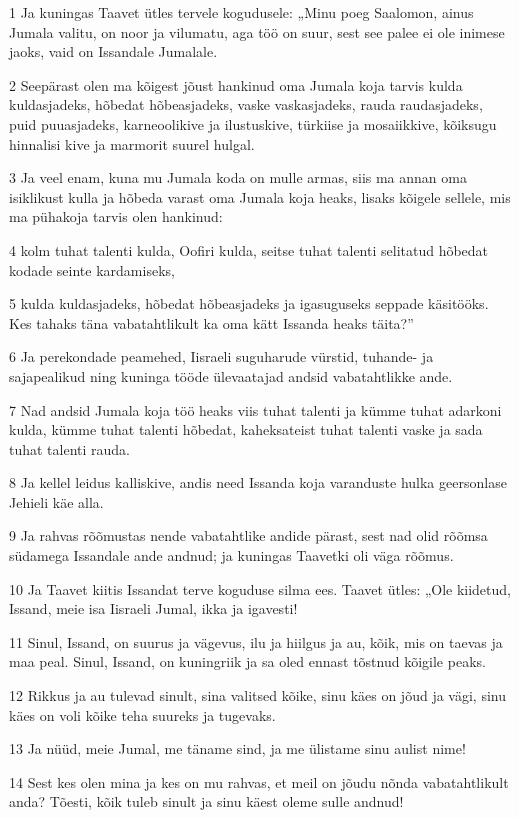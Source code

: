 \par 1 Ja kuningas Taavet ütles tervele kogudusele: „Minu poeg Saalomon, ainus Jumala valitu, on noor ja vilumatu, aga töö on suur, sest see palee ei ole inimese jaoks, vaid on Issandale Jumalale.
\par 2 Seepärast olen ma kõigest jõust hankinud oma Jumala koja tarvis kulda kuldasjadeks, hõbedat hõbeasjadeks, vaske vaskasjadeks, rauda raudasjadeks, puid puuasjadeks, karneoolikive ja ilustuskive, türkiise ja mosaiikkive, kõiksugu hinnalisi kive ja marmorit suurel hulgal.
\par 3 Ja veel enam, kuna mu Jumala koda on mulle armas, siis ma annan oma isiklikust kulla ja hõbeda varast oma Jumala koja heaks, lisaks kõigele sellele, mis ma pühakoja tarvis olen hankinud:
\par 4 kolm tuhat talenti kulda, Oofiri kulda, seitse tuhat talenti selitatud hõbedat kodade seinte kardamiseks,
\par 5 kulda kuldasjadeks, hõbedat hõbeasjadeks ja igasuguseks seppade käsitööks. Kes tahaks täna vabatahtlikult ka oma kätt Issanda heaks täita?”
\par 6 Ja perekondade peamehed, Iisraeli suguharude vürstid, tuhande- ja sajapealikud ning kuninga tööde ülevaatajad andsid vabatahtlikke ande.
\par 7 Nad andsid Jumala koja töö heaks viis tuhat talenti ja kümme tuhat adarkoni kulda, kümme tuhat talenti hõbedat, kaheksateist tuhat talenti vaske ja sada tuhat talenti rauda.
\par 8 Ja kellel leidus kalliskive, andis need Issanda koja varanduste hulka geersonlase Jehieli käe alla.
\par 9 Ja rahvas rõõmustas nende vabatahtlike andide pärast, sest nad olid rõõmsa südamega Issandale ande andnud; ja kuningas Taavetki oli väga rõõmus.
\par 10 Ja Taavet kiitis Issandat terve koguduse silma ees. Taavet ütles: „Ole kiidetud, Issand, meie isa Iisraeli Jumal, ikka ja igavesti!
\par 11 Sinul, Issand, on suurus ja vägevus, ilu ja hiilgus ja au, kõik, mis on taevas ja maa peal. Sinul, Issand, on kuningriik ja sa oled ennast tõstnud kõigile peaks.
\par 12 Rikkus ja au tulevad sinult, sina valitsed kõike, sinu käes on jõud ja vägi, sinu käes on voli kõike teha suureks ja tugevaks.
\par 13 Ja nüüd, meie Jumal, me täname sind, ja me ülistame sinu aulist nime!
\par 14 Sest kes olen mina ja kes on mu rahvas, et meil on jõudu nõnda vabatahtlikult anda? Tõesti, kõik tuleb sinult ja sinu käest oleme sulle andnud!
